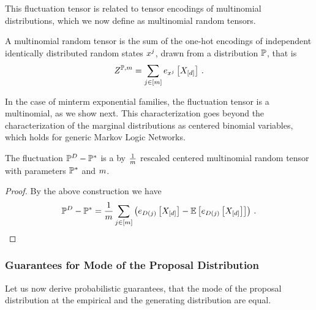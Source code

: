 This fluctuation tensor is related to tensor encodings of multinomial distributions, which we now define as multinomial random tensors.

\begin{definition}
    \label{def:mulinomialVariable}
    A multinomial random tensor is the sum of the one-hot encodings of independent identically distributed random states $x^j$, drawn from a distribution $\mathbb{P}$, that is
    \[ Z^{\mathbb{P}, m} = \sum_{j\in[m]} e_{x^j}\left[X_{[d]}\right] \, . \]
\end{definition}

In the case of minterm exponential families, the fluctuation tensor is a multinomial, as we show next.
This characterization goes beyond the characterization of the marginal distributions as centered binomial variables, which holds for generic Markov Logic Networks.

\begin{lemma}
    \label{lem:multinomialEmpdistFluctuation}
    The fluctuation $\mathbb{P}^{D} - \mathbb{P}^*$ is a by $\frac{1}{m}$ rescaled centered multinomial random tensor with parameters $\mathbb{P}^*$ and $m$. %
\end{lemma}
\begin{proof}
    By the above construction we have
    \[  \mathbb{P}^{D} - \mathbb{P}^*
    = \frac{1}{m}\sum_{j\in[m]} \left( e_{D(j)}\left[X_{[d]}\right] - \mathbb{E}\left[e_{D(j)}\left[X_{[d]}\right]\right] \right) \, .  \]
\end{proof}

\subsubsection{Guarantees for Mode of the Proposal Distribution}

Let us now derive probabilistic guarantees, that the mode of the proposal distribution at the empirical and the generating distribution are equal.

